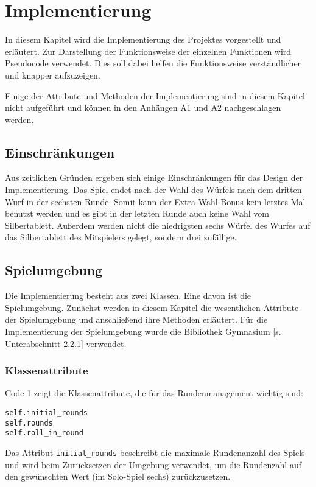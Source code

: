 \section{Implementierung}
In diesem Kapitel wird die Implementierung des Projektes vorgestellt und erläutert. Zur Darstellung der Funktionsweise der einzelnen Funktionen wird Pseudocode verwendet. Dies soll dabei helfen die Funktionsweise verständlicher und knapper aufzuzeigen.

Einige der Attribute und Methoden der Implementierung sind in diesem Kapitel nicht aufgeführt und können in den Anhängen A1 und A2 nachgeschlagen werden.
\subsection{Einschränkungen}
Aus zeitlichen Gründen ergeben sich einige Einschränkungen für das Design der Implementierung. Das Spiel endet nach der Wahl des Würfels nach dem dritten Wurf in der sechsten Runde. Somit kann der Extra-Wahl-Bonus kein letztes Mal benutzt werden und es gibt in der letzten Runde auch keine Wahl vom Silbertablett. Außerdem werden nicht die niedrigsten sechs Würfel des Wurfes auf das Silbertablett des Mitspielers gelegt, sondern drei zufällige.
\subsection{Spielumgebung}
Die Implementierung besteht aus zwei Klassen. Eine davon ist die Spielumgebung. Zunächst werden in diesem Kapitel die wesentlichen Attribute der Spielumgebung und anschließend ihre Methoden erläutert. Für die Implementierung der Spielumgebung wurde die Bibliothek Gymnasium [s. Unterabschnitt 2.2.1] verwendet.
\subsubsection{Klassenattribute}
\begin{minipage}{\linewidth}
Code 1 zeigt die Klassenattribute, die für das Rundenmanagement wichtig sind:
\vspace{0.5cm}
\begin{lstlisting}[caption={Klassenattribute für das Runden-System}, basicstyle=\ttfamily]
self.initial_rounds
self.rounds
self.roll_in_round
\end{lstlisting}
\end{minipage}

Das Attribut \texttt{initial\_rounds} beschreibt die maximale Rundenanzahl des Spiels und wird beim Zurücksetzen der Umgebung verwendet, um die Rundenzahl auf den gewünschten Wert (im Solo-Spiel sechs) zurückzusetzen.

